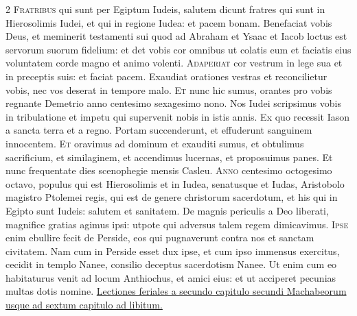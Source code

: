 \begin{multicols*}{2}
{\color{Red} }
\lettrine[lines=2]{\zallmancaps \color{Blue} F}{ratribus} qui sunt per Egiptum Iudeis, salutem dicunt fratres qui sunt in Hierosolimis Iudei, et qui in regione Iudea: et pacem bonam. Benefaciat vobis Deus, et meminerit testamenti sui quod ad Abraham et Ysaac et Iacob loctus est servorum suorum fidelium: et det vobis cor omnibus ut colatis eum et faciatis eius voluntatem corde magno et animo volenti.
\lettrine[lines=2]{\zallmancaps \color{Red} A}{daperiat} cor vestrum in lege sua et in preceptis suis: et faciat pacem. Exaudiat orationes vestras et reconcilietur vobis, nec vos deserat in tempore malo.
\lettrine[lines=2]{\zallmancaps \color{Blue} E}{t} nunc hic sumus, orantes pro vobis regnante Demetrio anno centesimo sexagesimo nono. Nos Iudei scripsimus vobis in tribulatione et impetu qui supervenit nobis in istis annis. Ex quo recessit Iason a sancta terra et a regno. Portam succenderunt, et effuderunt sanguinem innocentem.
\lettrine[lines=2]{\zallmancaps \color{Red} E}{t} oravimus ad dominum et exauditi sumus, et obtulimus sacrificium, et similaginem, et accendimus lucernas, et proposuimus panes. Et nunc frequentate dies scenophegie mensis Casleu.
\lettrine[lines=2]{\zallmancaps \color{Blue} A}{nno} centesimo octogesimo octavo, populus qui est Hierosolimis et in Iudea, senatusque et Iudas, Aristobolo magistro Ptolemei regis, qui est de genere christorum sacerdotum, et his qui in Egipto sunt Iudeis: salutem et sanitatem. De magnis periculis a Deo liberati, magnifice gratias agimus ipsi: utpote qui adversus talem regem dimicavimus.
\lettrine[lines=2]{\zallmancaps \color{Red} I}{pse} enim ebullire fecit de Perside, eos qui pugnaverunt contra nos et sanctam civitatem. Nam cum in Perside esset dux ipse, et cum ipso immensus exercitus, cecidit in templo Nanee, consilio deceptus sacerdotism Nanee. Ut enim cum eo habitaturus venit ad locum Anthiochus, et amici eius: et ut acciperet pecunias multas dotis nomine.
\newline \ul{Lectiones feriales a secundo capitulo secundi Machabeorum usque ad sextum capitulo ad libitum.}

\end{multicols*}
